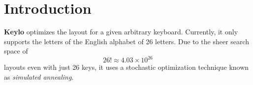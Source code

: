 \section{Introduction}

\textbf{Keylo} optimizes the layout for a given arbitrary keyboard.
Currently, it only supports the letters of the English alphabet of 26 letters.
Due to the sheer search space of \[26! \approx 4.03 \times 10^{26}\] layouts even with just 26 keys, it uses a stochastic optimization technique known as \textit{simulated annealing}.
